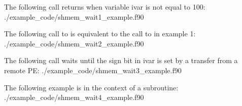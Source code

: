 \begin{apidefinition}

\begin{apiexamples}

\apifexample
{ The following call returns when variable ivar is not equal to 100:}
{./example_code/shmem_wait1_example.f90}
{}

\apifexample
{ The following call to  is  equivalent to the
call to  in example 1:}
{./example_code/shmem_wait2_example.f90}
{}

\apicexample
{The following \CorCpp{} call waits until the sign bit in ivar is set by a
transfer from a remote PE:}
{./example_code/shmem_wait3_example.f90}
{}

\apifexample
{The following \Fortran{} example is in the context of a subroutine:}
{./example_code/shmem_wait4_example.f90}
{}

\end{apiexamples}

\end{apidefinition}
